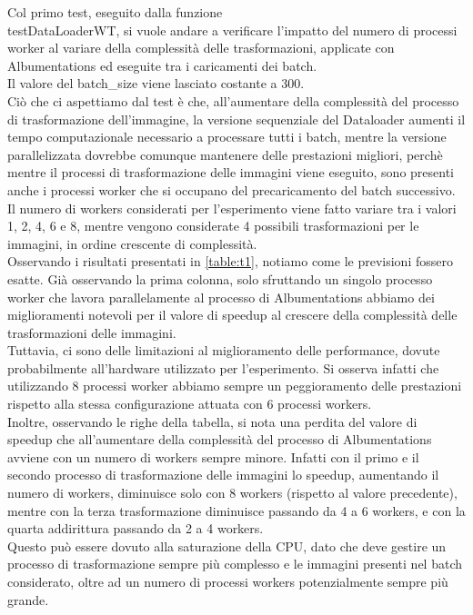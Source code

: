 \documentclass[10pt,twocolumn,letterpaper]{article}
\begin{document}
Col primo test, eseguito dalla funzione \\testDataLoaderWT, si vuole andare a verificare l'impatto del numero di processi worker al variare della complessità delle trasformazioni, applicate con Albumentations ed eseguite tra i caricamenti dei batch.\\
Il valore del batch\_size viene lasciato costante a 300.\\
Ciò che ci aspettiamo dal test è che, all'aumentare della complessità del processo di trasformazione dell'immagine, la versione sequenziale del Dataloader aumenti il tempo computazionale necessario a processare tutti i batch, mentre la versione parallelizzata dovrebbe comunque mantenere delle prestazioni migliori, perchè mentre il processi di trasformazione delle immagini viene eseguito, sono presenti anche i processi worker che si occupano del precaricamento del batch successivo.\\
Il numero di workers considerati per l'esperimento viene fatto variare tra i valori 1, 2, 4, 6 e 8, mentre vengono considerate 4 possibili trasformazioni per le immagini, in ordine crescente di complessità.\\
Osservando i risultati presentati in \cref{table:t1}, notiamo come le previsioni fossero esatte. Già osservando la prima colonna, solo sfruttando un singolo processo worker che lavora parallelamente al processo di Albumentations abbiamo dei miglioramenti notevoli per il valore di speedup al crescere della complessità delle trasformazioni delle immagini.\\
Tuttavia, ci sono delle limitazioni al miglioramento delle performance, dovute probabilmente all'hardware utilizzato per l'esperimento. Si osserva infatti che utilizzando 8 processi worker abbiamo sempre un peggioramento delle prestazioni rispetto alla stessa configurazione attuata con 6 processi workers.\\
Inoltre, osservando le righe della tabella, si nota una perdita del valore di speedup che all'aumentare della complessità del processo di Albumentations avviene con un numero di workers sempre minore. Infatti con il primo e il secondo processo di trasformazione delle immagini lo speedup, aumentando il numero di workers, diminuisce solo con 8 workers (rispetto al valore precedente), mentre con la terza trasformazione diminuisce passando da 4 a 6 workers, e con la quarta addirittura passando da 2 a 4 workers.\\
Questo può essere dovuto alla saturazione della CPU, dato che deve gestire un processo di trasformazione sempre più complesso e le immagini presenti nel batch considerato, oltre ad un numero di processi workers potenzialmente sempre più grande.\\
\end{document}
